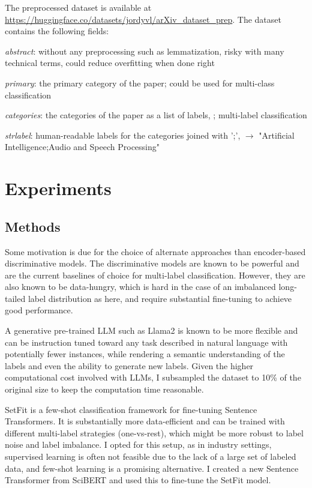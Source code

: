 \documentclass[11pt,letterpaper]{article}
\begin{document}
The preprocessed dataset is available at \url{https://huggingface.co/datasets/jordyvl/arXiv_dataset_prep}. The dataset contains the following fields:
\begin{simplist}
  \item \textit{abstract}: without any preprocessing such as lemmatization, risky with many technical terms, could reduce overfitting when done right
  \item \textit{primary}: the primary category of the paper; could be used for multi-class classification
  \item \textit{categories}: the categories of the paper as a list of labels, \eg [cs.AI, eess.AS]; multi-label classification
  \item \textit{strlabel}: human-readable labels for the categories joined with ';', \eg [cs.AI, eess.AS]  $\to$ "Artificial Intelligence;Audio and Speech Processing"
\end{simplist}


\section{Experiments}

\subsection{Methods}

Some motivation is due for the choice of alternate approaches than encoder-based discriminative models. The discriminative models are known to be powerful and are the current baselines of choice for multi-label classification. However, they are also known to be data-hungry, which is hard in the case of an imbalanced long-tailed label distribution as here, and require substantial fine-tuning to achieve good performance.

A generative pre-trained LLM such as Llama2 \cite{touvron2023llama} is known to be more flexible and can be instruction tuned toward any task described in natural language with potentially fewer instances,
while rendering a semantic understanding of the labels and even the ability to generate new labels. Given the higher computational cost involved with LLMs, I subsampled the dataset to 10\% of the original size to keep the computation time reasonable.

SetFit \cite{tunstall2022efficient} is a few-shot classification framework for fine-tuning Sentence Transformers. It is substantially more data-efficient and can be trained with different multi-label strategies (one-vs-rest), which might be more robust to label noise and label imbalance. I opted for this setup, as in industry settings, supervised learning is often not feasible due to the lack of a large set of labeled data, and few-shot learning is a promising alternative. I created a new Sentence Transformer from SciBERT and used this to fine-tune the SetFit model.
\end{document}
